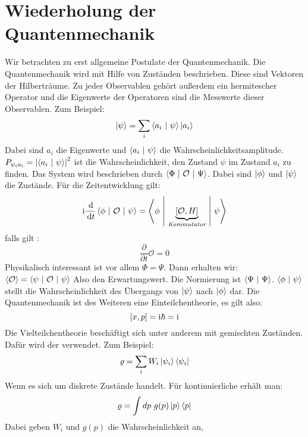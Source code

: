\section{Wiederholung der Quantenmechanik}
Wir betrachten zu erst allgemeine Postulate der Quantenmechanik.
Die Quantenmechanik wird mit Hilfe von Zuständen beschrieben. Diese sind 
Vektoren der Hilberträume. Zu jeder Observablen gehört außerdem ein hermitescher
Operator und die Eigenwerte der Operatoren sind die Messwerte dieser
Observablen.
Zum Beispiel:
%
\begin{equation*}
	\left| \psi \right\rangle = \sum_i{\left\langle a_i \ \middle| \ \psi\right\rangle \left| a_i \right\rangle}
\end{equation*} 
%
Dabei sind $ a_i $ die Eigenwerte und $ \left\langle a_i \ \middle| \ \psi\right\rangle $ die
Wahrscheinlichkeitsamplitude.
$ P_{\psi_i a_i} = {\left| \left\langle a_i \ \middle| \ \psi\right\rangle \right|}^2 $ ist die 
Wahrscheinlichkeit, den Zustand $\psi$ im Zustand $a_i$ zu finden.
Das System wird beschrieben durch $ \left\langle \Phi \ \middle| \ \mathcal{O} \ \middle| \ \Psi\right\rangle $. 
Dabei sind $\left| \phi \right\rangle$ und $\left| \psi \right\rangle$ die Zustände. 
Für die Zeitentwicklung gilt: 
%
\begin{equation*}
	\text{i} \frac{\mathop{}\mathrm{d}}{\mathop{}\mathrm{d} t} \left\langle \phi \ \middle| \ \mathcal{O} \ \middle| \ \psi\right\rangle = 
	\left\langle \phi \ \middle| \ \underbrace{\left[\mathcal{O},H\right]}_{\textit{Kommutator}} \ \middle| \ \psi\right\rangle
\end{equation*} 
%
falls gilt : 
%
\begin{equation*}
	\frac{\partial}{\partial t} \mathcal{O} = 0 
\end{equation*}  
%
Physikalisch interessant ist vor allem $ \Phi = \Psi $. Dann erhalten wir: 
$ \left\langle \mathcal{O} \right\rangle = \left\langle \psi \ \middle| \ \mathcal{O} \ \middle| \ \psi\right\rangle $
Also den Erwartungswert. Die Normierung ist $ \left\langle \Psi \ \middle| \ \Psi\right\rangle$.
$\left\langle \phi \ \middle| \ \psi\right\rangle$ stellt die Wahrscheinlichkeit des Übergangs von 
$\left| \psi \right\rangle$ nach $\left| \phi \right\rangle$ dar.
Die Quantenmechanik ist des Weiteren eine Einteilchentheorie, es gilt also:
%
\begin{equation*}
	\left[ x,p \right] = \text{i} \hbar = \text{i}
\end{equation*}
%
Die Vielteilchentheorie beschäftigt sich unter anderem mit gemischten 
Zuständen. Dafür wird der  verwendet.
Zum Beispiel: 
%
\begin{equation*}
	\varrho = \sum_i{W_i \left| \psi_i \right\rangle \left\langle \psi_i \right|}
\end{equation*} 
%
Wenn es sich um diskrete Zustände handelt. Für kontinuierliche erhält man:
%
\begin{equation*}
	\varrho = \int{dp\ g(p) \left| p \right\rangle \left\langle p \right|}
\end{equation*}
%
Dabei geben $W_i$ und $g(p) $ die Wahrscheinlichkeit an,